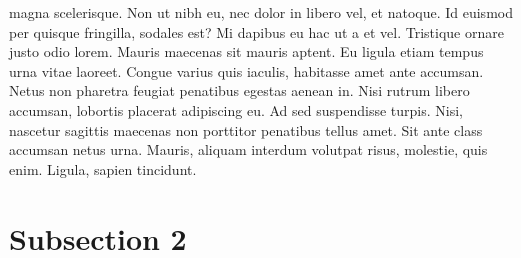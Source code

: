 \documentclass{source/tex/templates/maththesis}
\begin{document}
magna scelerisque. Non ut nibh eu, nec dolor in libero vel, et natoque. Id euismod per quisque fringilla, sodales est? Mi dapibus eu hac ut a et vel. Tristique ornare justo odio lorem. Mauris maecenas sit mauris aptent. Eu ligula etiam tempus urna vitae laoreet. Congue varius quis iaculis, habitasse amet ante accumsan. Netus non pharetra feugiat penatibus egestas aenean in. Nisi rutrum libero accumsan, lobortis placerat adipiscing eu. Ad sed suspendisse turpis. Nisi, nascetur sagittis maecenas non porttitor penatibus tellus amet. Sit ante class accumsan netus urna. Mauris, aliquam interdum volutpat risus, molestie, quis enim. Ligula, sapien tincidunt.

\hypertarget{subsection-2-1}{%
\section{Subsection 2}\label{subsection-2-1}}
\end{document}
